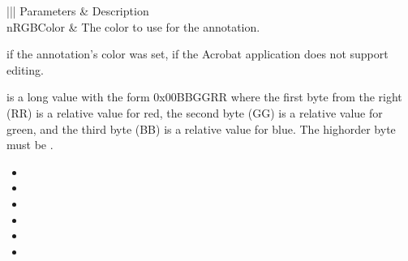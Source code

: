 \documentclass[letterpaper,12pt,english,openany,oneside]{sphinxmanual}
\begin{document}

\begin{sphinxVerbatim}[commandchars=\\\{\}]
  
\end{sphinxVerbatim}
\label{\detokenize{IAC_API_OLE_Objects:parameters-41}}


\begin{savenotes}\sphinxattablestart
\centering
{}\label{\detokenize{IAC_API_OLE_Objects:section-46}}\nobreak
\begin{tabular}[t]{|||}
\hline
\sphinxstyletheadfamily 
Parameters
&\sphinxstyletheadfamily 
Description
\\
\hline
nRGBColor
&
The color to use for the annotation.
\\
\hline
\end{tabular}
\par
\sphinxattableend\end{savenotes}


 if the annotation’s color was set,  if the Acrobat application does not support editing.

 is a long value with the form 0x00BBGGRR where the first byte from the right (RR) is a relative value for red, the second byte (GG) is a relative value for green, and the third byte (BB) is a relative value for blue. The high\sphinxhyphen{}order byte must be .

\label{\detokenize{IAC_API_OLE_Objects:related-methods-76}}
\begin{itemize}
\item {} 
 

\item {} 
 

\item {} 
 

\item {} 
 

\item {} 
 

\item {} 
 

\end{itemize}
\end{document}
